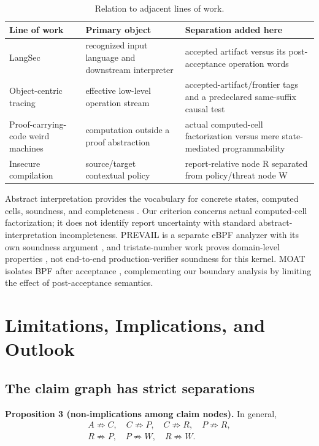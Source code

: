 \documentclass[conference]{IEEEtran}
\begin{document}
\begin{table}[t]
\caption{Relation to adjacent lines of work.}
\label{tab:related-work}
\centering
\begin{tabularx}{\textwidth}{@{}p{}p{}Y@{}}
\toprule
Line of work & Primary object & Separation added here \\
\midrule
LangSec \cite{ref1,ref2,ref3,ref4} & recognized input language and downstream interpreter & accepted artifact versus its post-acceptance operation words \\
Object-centric tracing \cite{ref10} & effective low-level operation stream & accepted-artifact/frontier tags and a predeclared same-suffix causal test \\
Proof-carrying-code weird machines \cite{ref16} & computation outside a proof abstraction & actual computed-cell factorization versus mere state-mediated programmability \\
Insecure compilation \cite{ref15} & source/target contextual policy & report-relative node R separated from policy/threat node W \\
\bottomrule
\end{tabularx}
\end{table}

Abstract interpretation provides the vocabulary for concrete states, computed cells, soundness, and completeness \cite{ref5,ref17}. Our criterion concerns actual computed-cell factorization; it does not identify report uncertainty with standard abstract-interpretation incompleteness. PREVAIL is a separate eBPF analyzer with its own soundness argument \cite{ref18}, and tristate-number work proves domain-level properties \cite{ref19}, not end-to-end production-verifier soundness for this kernel. MOAT isolates BPF after acceptance \cite{ref20}, complementing our boundary analysis by limiting the effect of post-acceptance semantics.

\section{Limitations, Implications, and Outlook}

\subsection{The claim graph has strict separations}

\medskip
\noindent\textbf{Proposition 3 (non-implications among claim nodes).}
In general,
\begin{equation}
\begin{gathered}
A\not\Rightarrow C,\quad
C\not\Rightarrow P,\quad
C\not\Rightarrow R,\quad
P\not\Rightarrow R,\\
R\not\Rightarrow P,\quad
P\not\Rightarrow W,\quad
R\not\Rightarrow W.
\end{gathered}
\end{equation}
\end{document}
